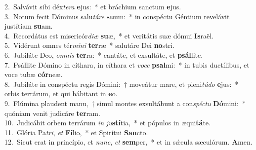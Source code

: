 {2.~}Salvávit sibi déx\textit{te}\textit{ra} \textbf{e}jus:~* et bráchium sanctum \textbf{e}jus.\\
{3.~}Notum fecit Dóminus salu\textit{tá}\textit{re} \textbf{su}um:~* in conspéctu Géntium revelávit justítiam \textbf{su}am.\\
{4.~}Recordátus est misericór\textit{di}\textit{æ} \textbf{su}æ,~* et veritátis suæ dómui \textbf{Is}raël.\\
{5.~}Vidérunt omnes tér\textit{mi}\textit{ni} \textbf{ter}ræ~* salutáre Dei \textbf{no}stri.\\
{6.~}Jubiláte Deo, \textit{om}\textit{nis} \textbf{ter}ra:~* cantáte, et exsultáte, et \textbf{psál}lite.\\
{7.~}Psállite Dómino in cíthara, in cíthara et \textit{vo}\textit{ce} \textbf{psal}mi:~* in tubis ductílibus, et voce tubæ \textbf{cór}neæ.\\
{8.~}Jubiláte in conspéctu regis Dómini:~† moveátur mare, et pleni\textit{tú}\textit{do} \textbf{e}jus:~* orbis terrárum, et qui hábitant in \textbf{e}o.\\
{9.~}Flúmina plaudent manu,~† simul montes exsultábunt a con\textit{spé}\textit{ctu} \textbf{Dó}mini:~* quóniam venit judicáre \textbf{ter}ram.\\
{10.~}Judicábit orbem terrárum \textit{in} \textit{ju}\textbf{stí}tia,~* et pópulos in æqui\textbf{tá}te.\\
{11.~}Glória Pa\textit{tri}, \textit{et} \textbf{Fí}lio,~* et Spirítui \textbf{San}cto.\\
{12.~}Sicut erat in princípio, et \textit{nunc}, \textit{et} \textbf{sem}per,~* et in sǽcula sæculórum. \textbf{A}men.\\
